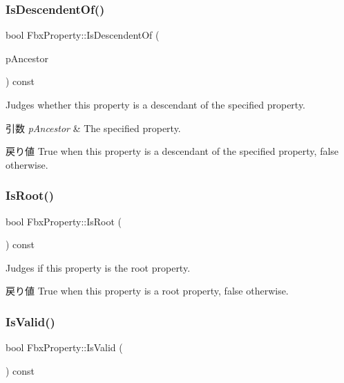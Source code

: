 \subsubsection{\texorpdfstring{Is\+Descendent\+Of()}{IsDescendentOf()}}
{\footnotesize\ttfamily bool Fbx\+Property\+::\+Is\+Descendent\+Of (\begin{DoxyParamCaption}\item[{const \hyperlink{class_fbx_property}{Fbx\+Property} \&}]{p\+Ancestor }\end{DoxyParamCaption}) const}

Judges whether this property is a descendant of the specified property. 
\begin{DoxyParams}{引数}
{\em p\+Ancestor} & The specified property. \\
\hline
\end{DoxyParams}
\begin{DoxyReturn}{戻り値}
{\ttfamily True} when this property is a descendant of the specified property, {\ttfamily false} otherwise. 
\end{DoxyReturn}
\mbox{\label{class_fbx_property_ac614dd09edb00ac99ce49332a66a597d}} 
\subsubsection{\texorpdfstring{Is\+Root()}{IsRoot()}}
{\footnotesize\ttfamily bool Fbx\+Property\+::\+Is\+Root (\begin{DoxyParamCaption}{ }\end{DoxyParamCaption}) const}

Judges if this property is the root property. \begin{DoxyReturn}{戻り値}
{\ttfamily True} when this property is a root property, {\ttfamily false} otherwise. 
\end{DoxyReturn}
\mbox{\label{class_fbx_property_a1c40042c55d1f4a1d4837f06fbc1d764}} 
\subsubsection{\texorpdfstring{Is\+Valid()}{IsValid()}}
{\footnotesize\ttfamily bool Fbx\+Property\+::\+Is\+Valid (\begin{DoxyParamCaption}{ }\end{DoxyParamCaption}) const}

